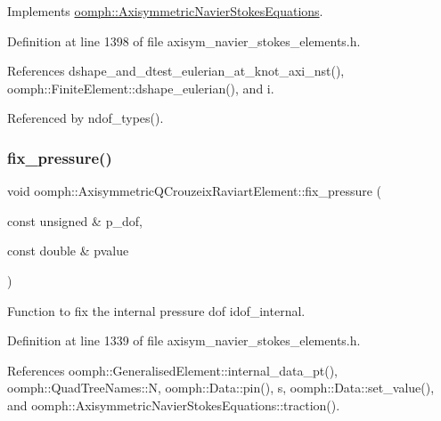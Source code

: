 Implements \hyperlink{classoomph_1_1AxisymmetricNavierStokesEquations_a8d958da8ef73dcf5c68360edc9d9f565}{oomph\+::\+Axisymmetric\+Navier\+Stokes\+Equations}.



Definition at line 1398 of file axisym\+\_\+navier\+\_\+stokes\+\_\+elements.\+h.



References dshape\+\_\+and\+\_\+dtest\+\_\+eulerian\+\_\+at\+\_\+knot\+\_\+axi\+\_\+nst(), oomph\+::\+Finite\+Element\+::dshape\+\_\+eulerian(), and i.



Referenced by ndof\+\_\+types().

\mbox{\label{classoomph_1_1AxisymmetricQCrouzeixRaviartElement_a65e65b5d7dd33b374c259b53dc99a83c}} 
\subsubsection{\texorpdfstring{fix\+\_\+pressure()}{fix\_pressure()}}
{\footnotesize\ttfamily void oomph\+::\+Axisymmetric\+Q\+Crouzeix\+Raviart\+Element\+::fix\+\_\+pressure (\begin{DoxyParamCaption}\item[{const unsigned \&}]{p\+\_\+dof,  }\item[{const double \&}]{pvalue }\end{DoxyParamCaption})\hspace{0.3cm}{\ttfamily [inline]}}



Function to fix the internal pressure dof idof\+\_\+internal. 



Definition at line 1339 of file axisym\+\_\+navier\+\_\+stokes\+\_\+elements.\+h.



References oomph\+::\+Generalised\+Element\+::internal\+\_\+data\+\_\+pt(), oomph\+::\+Quad\+Tree\+Names\+::N, oomph\+::\+Data\+::pin(), s, oomph\+::\+Data\+::set\+\_\+value(), and oomph\+::\+Axisymmetric\+Navier\+Stokes\+Equations\+::traction().

